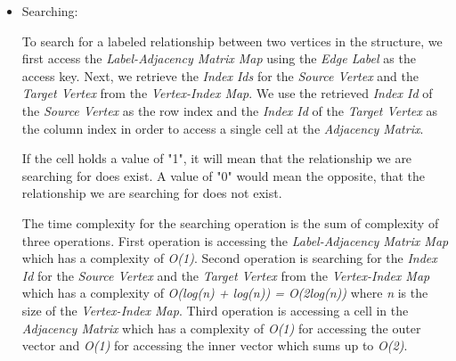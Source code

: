 {\begin{itemize}
An insertion of new element(s) into the \textit{Vertex-Index Map} means that we must make a corresponding expansion in the \textit{Adjacency Matrix} to accommodate the relationship flags of the new elements(s). The \textit{Adjacency Matrix} is expanded by adding more columns and rows so that the final size of the matrix is equal to \textit{$m \times $m}, where \textit{m} is the number of pairs stored in the \textit{Vertex-Index Map}. The new cells added after expansion are all populated with a "0" value. 

Moreover, we use the \textit{Index Id} of the \textit{Source Vertex} as the row index and the \textit{Index Id} of the \textit{Target Vertex} as the column index in order to access a single cell at the \textit{Adjacency Matrix} and set the cell's flag to "1" to indicate an existence of a relationship between the \textit{Source Vertex} and the \textit{Target Vertex}.

\item{Searching:}

To search for a labeled relationship between two vertices in the structure, we first access the \textit{Label-Adjacency Matrix Map} using the \textit{Edge Label} as the access key. Next, we retrieve the \textit{Index Ids} for the \textit{Source Vertex} and the \textit{Target Vertex} from the \textit{Vertex-Index Map}. We use the retrieved \textit{Index Id} of the \textit{Source Vertex} as the row index and the \textit{Index Id} of the \textit{Target Vertex} as the column index in order to access a single cell at the \textit{Adjacency Matrix}.

If the cell holds a value of "1", it will mean that the relationship we are searching for does exist. A value of "0" would mean the opposite, that the relationship we are searching for does not exist.

The time complexity for the searching operation is the sum of complexity of three operations. First operation is accessing the \textit{Label-Adjacency Matrix Map} which has a complexity of \textit{O(1)}. Second operation is searching for the \textit{Index Id} for the \textit{Source Vertex} and the \textit{Target Vertex} from the \textit{Vertex-Index Map} which has a complexity of \textit{O(log(n) + log(n)) = O(2log(n))} where \textit{n} is the size of the \textit{Vertex-Index Map}. Third operation is accessing a cell in the \textit{Adjacency Matrix} which has a complexity of \textit{O(1)} for accessing the outer vector and \textit{O(1)} for accessing the inner vector which sums up to \textit{O(2)}.


\end{itemize}}
